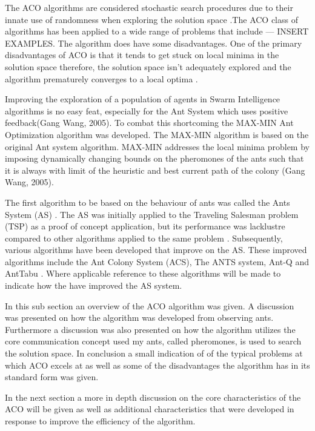The ACO algorithms are considered stochastic search procedures due to their innate use of randomness when exploring the solution space \cite{ACOSurvey,ImpACOComplex}.The ACO class of algorithms has been applied to a wide range of problems that include --- INSERT EXAMPLES. The algorithm does have some disadvantages. One of the primary disadvantages of ACO is that it tends to get stuck on local minima in the solution space therefore, the solution space isn't adequately explored and the algorithm prematurely converges to a local optima \cite{ImpACOComplex}.

Improving the exploration of a population of agents in Swarm Intelligence algorithms is no easy feat, especially for the Ant System which uses positive feedback(Gang Wang, 2005). To combat this shortcoming the MAX-MIN Ant Optimization algorithm was developed. The MAX-MIN algorithm is based on the original Ant system algorithm. MAX-MIN addresses the local minima problem by imposing dynamically changing bounds on the pheromones of the ants such that it is always with limit of the heuristic and best current path of the colony (Gang Wang, 2005).

The first algorithm to be based on the behaviour of ants was called the Ants System (AS) \cite{CompuIntelligenceIntro,AntIntroTrends}. The AS was initially applied to the Traveling Salesman problem (TSP) as a proof of concept application, but its performance was lacklustre compared to other algorithms applied to the same problem \cite{CompuIntelligenceIntro,AntIntroTrends}. Subsequently, various algorithms have been developed that improve on the AS. These improved algorithms include the Ant Colony System (ACS), The ANTS system, Ant-Q and AntTabu \cite{CompuIntelligenceIntro,AntIntroTrends}. Where applicable reference to these algorithms will be made to indicate how the have improved the AS system.

In this sub section an overview of the ACO algorithm was given. A discussion was presented on how the algorithm was developed from observing ants. Furthermore a discussion was also presented on how the algorithm utilizes the core communication concept used my ants, called pheromones, is used to search the solution space. In conclusion a small indication of of the typical problems at which ACO excels at as well as some of the disadvantages the algorithm has in its standard form was given.

In the next section a more in depth discussion on the core characteristics of the ACO will be given as well as additional characteristics that were developed in response to improve the efficiency of the algorithm.
